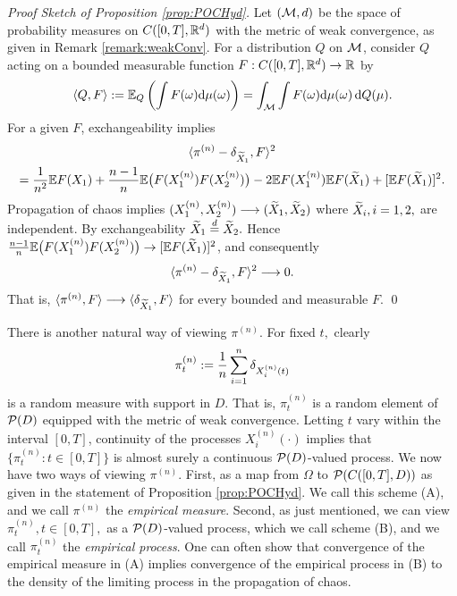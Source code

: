 \begin{proof}[Proof Sketch of Proposition \ref{prop:POCHyd}]
	Let $(\mathcal{M}, d)$ be the space of probability measures on $C([0, T], \mathbb{R}^d)$ with the metric of weak convergence, as given in Remark \ref{remark:weakConv}. For a distribution $Q$  on $\mathcal{M}$, consider $Q$ acting on a bounded measurable function $F : C([0, T], \mathbb{R}^d) \to \mathbb{R}$ by
	\[
	\langle Q, F \rangle := \mathbb{E}_Q \left(\int F(\omega) \mathrm{d} \mu (\omega)\right) = \int_{\mathcal{M}} \int F(\omega) \mathrm{d} \mu (\omega) \, \mathrm{d} Q( \mu).
	\]
	For a given $F$, exchangeability implies
	\begin{multline}
		\langle \pi^{(n)} - \delta_{\widetilde{X}_1}, F\rangle^2 \\ = \frac{1}{n^2}\mathbb{E} F(X_1) + \frac{n-1}{n}\mathbb{E} \big(F(X_1^{(n)})F(X_2^{(n)})\big)
		-2\mathbb{E} F(X_1^{(n)}) \mathbb{E} F(\widetilde{X}_1)  + [\mathbb{E} F(\widetilde{X}_1)]^2.
	\end{multline}
	Propagation of chaos implies $(X^{(n)}_1, X^{(n)}_2) \longrightarrow (\widetilde{X}_1, \widetilde{X}_2)$ where $\widetilde{X}_i, i =1, 2,$ are independent. By exchangeability $\widetilde{X}_1 \overset{d}{=}  \widetilde{X}_2.$ Hence $ \frac{n-1}{n}\mathbb{E} \big(F(X_1^{(n)})F(X_2^{(n)})\big) \to [\mathbb{E} F(\widetilde{X}_1)]^2$, and consequently
	\[
	\langle \pi^{(n)} - \delta_{\widetilde{X}_1}, F\rangle^2 \longrightarrow 0.
	\]
	That is, $\langle\pi^{(n)}, F\rangle \longrightarrow \langle \delta_{\widetilde{X}_1}, F \rangle$ for every bounded and measurable $F$.
	\qed
\end{proof}

There is another natural way of viewing $\pi^{(n)}$. For fixed $t,$ clearly 
\[
\pi^{(n)}_t := \frac{1}{n}\sum_{i = 1}^n\delta_{X_i^{(n)}(t)}
\]
is a random measure with support in $D.$ That is, $\pi^{(n)}_t$ is a random element of $\mathcal{P}(D)$ equipped with
the metric of weak convergence. Letting $t$ vary within the interval $[0, T]$, continuity of the processes $X_i^{(n)}(\cdot)$ implies that
$\{\pi^{(n)}_t : t \in [0, T]\}$ is almost surely a continuous $\mathcal{P}(D)$-valued process.
We now have two ways of viewing $\pi^{(n)}$. First, as a map from $\Omega$ to $\mathcal{P}(C([0, T], D))$ as given in the statement of Proposition \ref{prop:POCHyd}. We call this scheme (A), and we call $\pi^{(n)}$ the \emph{empirical measure}. Second, as just mentioned, we can view $\pi^{(n)}_t, t \in [0, T],$ as a $\mathcal{P}(D)$-valued process, which we call scheme (B), and we call $\pi^{(n)}_t$ the \emph{empirical process}.
One can often show that convergence of the empirical measure in (A) implies convergence of the empirical process in (B) to the density of the limiting process in the propagation of chaos.

